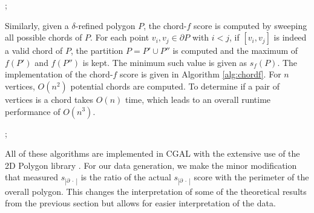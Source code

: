 \documentclass[]{jocg}
\newcommand{\abs}[1]{|#1|}
\newcommand{\chordarc}{{s_{\abs{\partial~\cdot~}}}}
\theoremstyle{definition}
\theoremstyle{remark}
\begin{document}
\begin{algorithm}[h]
  \begin{algorithmic}[1]
    ;
     
    \EndIf
    \EndFor
    \EndFor
    \EndFunction
  \end{algorithmic}
  \caption{%
    The $\alpha$-fatness function.  }
  \label{alg:alpha}
\end{algorithm}

Similarly, given a $\delta$-refined polygon $P$, the chord-$f$ score is computed
by sweeping all possible chords of $P$. For each point $v_i, v_j \in \partial P$
with $i < j$, if $[v_i, v_j]$ is indeed a valid chord of $P$, the partition $P =
P' \cup P''$ is computed and the maximum of $f(P')$ and $f(P'')$ is kept. The
minimum such value is given as $s_f(P)$. The implementation of the chord-$f$
score is given in Algorithm \ref{alg:chordf}. For $n$ vertices, $O(n^2)$
potential chords are computed. To determine if a pair of vertices is a chord
takes $O(n)$ time, which leads to an overall runtime performance of $O(n^3)$.



\begin{algorithm}[h]
  \begin{algorithmic}[1]
    ;
      \EndIf
    \EndIf
    \EndFor
    \EndFor
    \EndFunction
  \end{algorithmic}
  \caption{%
    The chord-$f$ function.   }
  \label{alg:chordf}
\end{algorithm}

All of these algorithms are implemented in CGAL \cite{cgal:eb-18a} with the
extensive use of the 2D Polygon library \cite{cgal:gw-p2-18a}. For our data
generation, we make the minor modification that measured ${\chordarc}$ is the
ratio of the actual $\chordarc$ score with the perimeter of the overall polygon.
This changes the interpretation of some of the theoretical results from the
previous section but allows for easier interpretation of the data.
\end{document}
